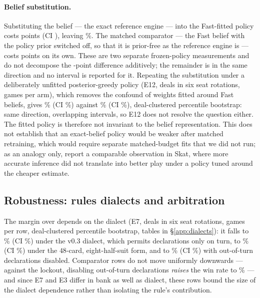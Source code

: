 \paragraph{Belief substitution.}
Substituting the \vblock{} belief --- the exact reference engine --- into the
Fast-fitted policy costs \numAblBlock{} points (CI \numAblBlockCI{}), leaving
\numAblBlockAbs\%. The matched comparator --- the Fast belief with the policy
prior switched off, so that it is prior-free as the reference engine is --- costs
\numAblPrior{} points on its own. These are two separate frozen-policy measurements and do not
decompose the \numAblBlock{}-point difference additively; the remainder is in the
same direction and no interval is reported for it. Repeating the substitution
under a deliberately unfitted posterior-greedy policy (E12, \numETwelveDeals{}
deals in six seat rotations, \numETwelveGames{} games per arm), which removes the
confound of weights fitted around Fast beliefs, gives \numETwelveFast\% (CI
\numETwelveFastCI\%) against \numETwelveBlock\% (CI \numETwelveBlockCI\%),
deal-clustered percentile bootstrap: same direction, overlapping intervals, so
E12 does not resolve the question either. The fitted policy is therefore not
invariant to the belief representation. This does not establish that an
exact-belief policy would be weaker after matched retraining, which would require
separate matched-budget fits that we did not run; as an analogy only,
\cite{rebstock-inference} report a comparable observation in Skat, where more
accurate inference did not translate into better play under a policy tuned around
the cheaper estimate.

\subsection{Robustness: rules dialects and arbitration}
\label{sec:robustness}

The margin over \vthree{} depends on the dialect (E7, \numEsevenDeals{} deals in
six seat rotations, \numEsevenGames{} games per row, deal-clustered percentile
bootstrap, tables in \S\ref{app:dialects}): it falls to \numEsevenVthreeLegacy\%
(CI \numEsevenVthreeLegacyCI\%) under the v0.3 dialect, which permits declarations
only on turn, to \numEsevenVthreeEight\% (CI \numEsevenVthreeEightCI\%) under the
$48$-card, eight-half-suit form, and to \numEsevenVthreeNoOOT\% (CI
\numEsevenVthreeNoOOTCI\%) with out-of-turn declarations disabled. Comparator rows
do not move uniformly downwards --- against the lockout, disabling out-of-turn
declarations \emph{raises} the win rate to \numEsevenLockoutNoOOT\% --- and since
E7 and E3 differ in bank as well as dialect, these rows bound the size of the
dialect dependence rather than isolating the rule's contribution.

